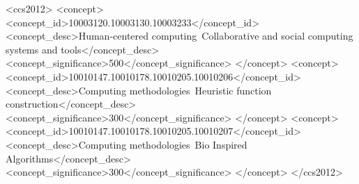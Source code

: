 \documentclass[sigconf]{acmart}
\begin{document}
%
%
\begin{CCSXML}
<ccs2012>
<concept>
<concept_id>10003120.10003130.10003233</concept_id>
<concept_desc>Human-centered computing~Collaborative and social computing systems and tools</concept_desc>
<concept_significance>500</concept_significance>
</concept>
<concept>
<concept_id>10010147.10010178.10010205.10010206</concept_id>
<concept_desc>Computing methodologies~Heuristic function construction</concept_desc>
<concept_significance>300</concept_significance>
</concept>
<concept>
<concept_id>10010147.10010178.10010205.10010207</concept_id>
<concept_desc>Computing methodologies~Bio Inspired Algorithms</concept_desc>
<concept_significance>300</concept_significance>
</concept>
</ccs2012>
\end{CCSXML}




\maketitle




 
\end{document}
